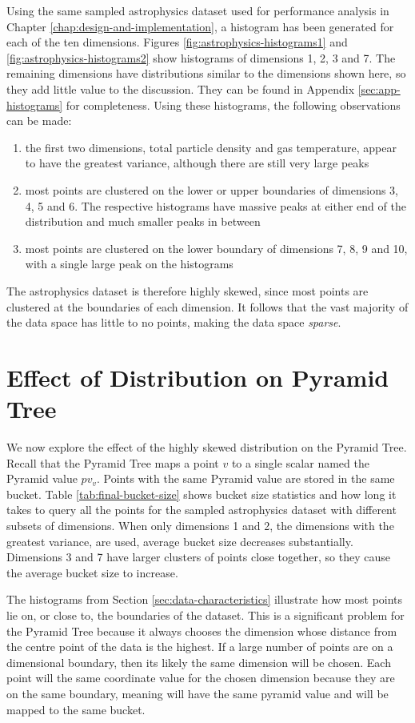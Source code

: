 Using the same sampled astrophysics dataset used for performance analysis in Chapter \ref{chap:design-and-implementation}, a histogram has been generated for each of the ten dimensions. Figures \ref{fig:astrophysics-histograms1} and \ref{fig:astrophysics-histograms2} show histograms of dimensions 1, 2, 3 and 7. The remaining dimensions have distributions similar to the dimensions shown here, so they add little value to the discussion. They can be found in Appendix \ref{sec:app-histograms} for completeness. Using these histograms, the following observations can be made:
\begin{enumerate}
	\item the first two dimensions, total particle density and gas temperature, appear to have the greatest variance, although there are still very large peaks
	\item most points are clustered on the lower or upper boundaries of dimensions 3, 4, 5 and 6. The respective histograms have massive peaks at either end of the distribution and much smaller peaks in between
	\item most points are clustered on the lower boundary of dimensions 7, 8, 9 and 10, with a single large peak on the histograms
\end{enumerate}
The astrophysics dataset is therefore highly skewed, since most points are clustered at the boundaries of each dimension. It follows that the vast majority of the data space has little to no points, making the data space \textit{sparse}.

\section{Effect of Distribution on Pyramid Tree}

We now explore the effect of the highly skewed distribution on the Pyramid Tree. Recall that the Pyramid Tree maps a point $v$ to a single scalar named the Pyramid value $pv_v$. Points with the same Pyramid value are stored in the same bucket. Table \ref{tab:final-bucket-size} shows bucket size statistics and how long it takes to query all the points for the sampled astrophysics dataset with different subsets of dimensions. When only dimensions 1 and 2, the dimensions with the greatest variance, are used, average bucket size decreases substantially. Dimensions 3 and 7 have larger clusters of points close together, so they cause the average bucket size to increase.

The histograms from Section \ref{sec:data-characteristics} illustrate how most points lie on, or close to, the boundaries of the dataset. This is a significant problem for the Pyramid Tree because it always chooses the dimension whose distance from the centre point of the data is the highest. If a large number of points are on a dimensional boundary, then its likely the same dimension will be chosen. Each point will the same coordinate value for the chosen dimension because they are on the same boundary, meaning will have the same pyramid value and will be mapped to the same bucket.


